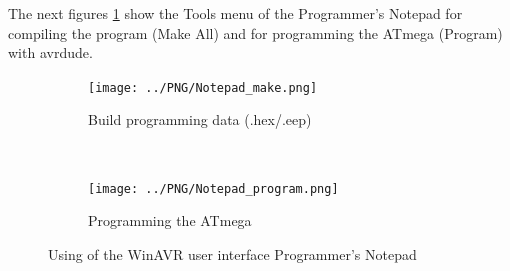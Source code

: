 The next figures \ref{fig:WinAVR2} show the Tools menu of the Programmer's Notepad
for compiling the program (Make All) and for programming the ATmega (Program) with avrdude.

\begin{figure}[H]
  \begin{subfigure}[b]{9cm}
    \centering
    \texttt{[image: ../PNG/Notepad\_make.png]}
    \caption{Build programming data (.hex/.eep)}
  \end{subfigure}
  ~
  \begin{subfigure}[b]{9cm}
    \centering
    \texttt{[image: ../PNG/Notepad\_program.png]}
    \caption{Programming the ATmega}
  \end{subfigure}
  \caption{Using of the WinAVR user interface Programmer's Notepad}
  \label{fig:WinAVR2}
\end{figure}



